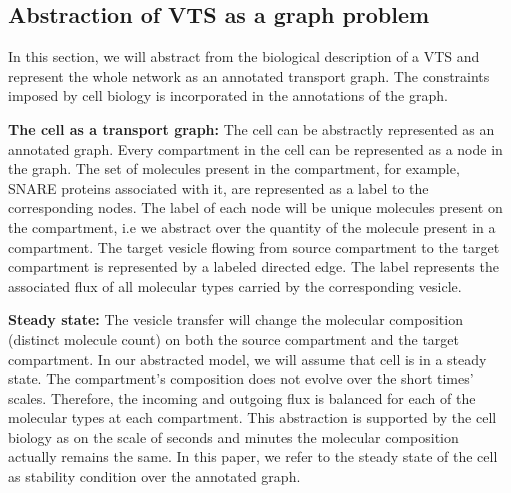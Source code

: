 \subsection{Abstraction of VTS as a graph problem}


In this section, we will abstract from the biological description of a VTS and represent the whole network as an annotated transport graph. 
%
The constraints imposed by cell biology is incorporated in the  annotations of the graph. 

\textbf{The cell as a transport graph:} 
The cell can be abstractly represented as an annotated graph. 
Every compartment in the cell can be represented as a node in the graph. 
%
The set of molecules present in the compartment, for example, SNARE proteins associated with it, are represented as a label to the corresponding nodes.
%
The label of each node will be unique molecules present on the compartment, i.e we abstract over the quantity of the molecule present in a compartment.
%
The target vesicle flowing from source compartment to the target compartment is represented by a labeled directed edge. 
% 
The label represents the associated flux of all molecular types carried by the corresponding vesicle.
%
%

\textbf{Steady state:} 
The vesicle transfer will change the molecular composition (distinct molecule count) on both the source compartment and the target compartment. 
%
In our abstracted model, we will assume that cell is in a steady state. 
%
The compartment's composition does not evolve over the short times' scales.
%
Therefore, the incoming and outgoing flux is balanced for each of the molecular types at each compartment.
%
This abstraction is supported by the cell biology as on the scale of seconds and minutes the molecular composition actually remains the same. 
%
In this paper, we refer to the steady state of the cell as stability condition over the annotated graph.



